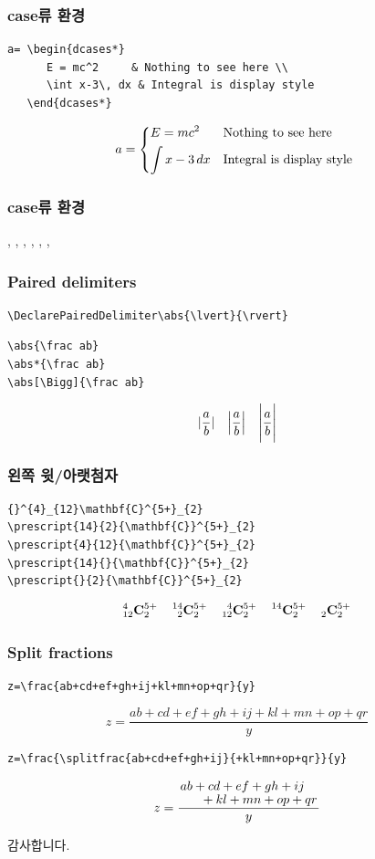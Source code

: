 \documentclass{beamer}
\begin{document}
\begin{frame}[fragile,t]
\frametitle{case류 환경}
\begin{verbatim}
a= \begin{dcases*}
      E = mc^2     & Nothing to see here \\
      \int x-3\, dx & Integral is display style
   \end{dcases*}
\end{verbatim}
\[
a= \begin{dcases*}
      E = mc^2     & Nothing to see here \\
      \int x-3\, dx & Integral is display style
   \end{dcases*}
\]
\end{frame}

\begin{frame}[fragile]
\frametitle{case류 환경}
\Large
\texttt{\string\dcases}, 
\alert{\texttt{\string\dcases*}}, 
\texttt{\string\rcases}, 
\texttt{\string\rcases*}, 
\texttt{\string\drcases}, 
\texttt{\string\drcases*}, 
\texttt{\string\cases*}
\end{frame}

\DeclarePairedDelimiter\abs{\lvert}{\rvert}
\begin{frame}[fragile,t]
\frametitle{Paired delimiters}
\begin{verbatim}
\DeclarePairedDelimiter\abs{\lvert}{\rvert}
\end{verbatim}
\begin{verbatim}
\abs{\frac ab}
\abs*{\frac ab}
\abs[\Bigg]{\frac ab}
\end{verbatim}
\[
\abs{\frac ab} \quad
\abs*{\frac ab} \quad
\abs[\Bigg]{\frac ab}
\]
\end{frame}

\begin{frame}[fragile,t]
\frametitle{왼쪽 윗/아랫첨자}
\begin{verbatim}
{}^{4}_{12}\mathbf{C}^{5+}_{2}          
\prescript{14}{2}{\mathbf{C}}^{5+}_{2} 
\prescript{4}{12}{\mathbf{C}}^{5+}_{2} 
\prescript{14}{}{\mathbf{C}}^{5+}_{2}   
\prescript{}{2}{\mathbf{C}}^{5+}_{2}
\end{verbatim}
{\Large
\[
      {}^{4}_{12}\mathbf{C}^{5+}_{2}          \quad
      \prescript{14}{2}{\mathbf{C}}^{5+}_{2}  \quad
      \prescript{4}{12}{\mathbf{C}}^{5+}_{2}  \quad
      \prescript{14}{}{\mathbf{C}}^{5+}_{2}   \quad
      \prescript{}{2}{\mathbf{C}}^{5+}_{2}
\]}
\end{frame}

\begin{frame}[fragile,t]
\frametitle{Split fractions}
\begin{verbatim}
z=\frac{ab+cd+ef+gh+ij+kl+mn+op+qr}{y}
\end{verbatim}

\[ 
z=\frac{ab+cd+ef+gh+ij+kl+mn+op+qr}{y} 
\]

\begin{verbatim}
z=\frac{\splitfrac{ab+cd+ef+gh+ij}{+kl+mn+op+qr}}{y}
\end{verbatim}

\[
z=\frac{\splitfrac{ab+cd+ef+gh+ij}{+kl+mn+op+qr}}{y}
\]
\end{frame}

\begin{frame}
\huge
\centering 감사합니다.
\end{frame}
\end{document}

